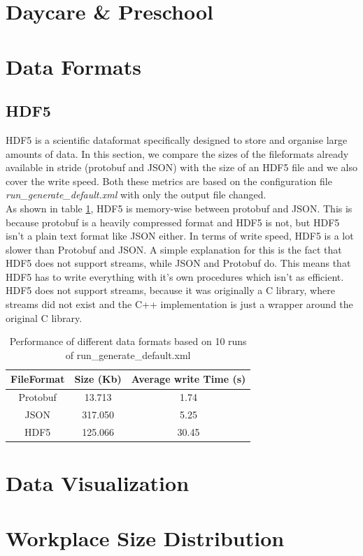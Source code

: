 \documentclass[runningheads]{llncs}
\begin{document}
	\section{Daycare \& Preschool}
	\section{Data Formats}
	\subsection{HDF5}
	HDF5 is a scientific dataformat specifically designed to store and organise large amounts of data. In this section, we compare the sizes of the fileformats already available in stride (protobuf and JSON) with the size of an HDF5 file and we also cover the write speed. Both these metrics are based on the configuration file \textit{run\_generate\_default.xml} with only the output file changed.
	\\
	As shown in table \ref{table:1}, HDF5 is memory-wise between protobuf and JSON. This is because protobuf is a heavily compressed format and HDF5 is not, but HDF5 isn't a plain text format like JSON either. In terms of write speed, HDF5 is a lot slower than Protobuf and JSON. A simple explanation for this is the fact that HDF5 does not support streams, while JSON and Protobuf do. This means that HDF5 has to write everything with it's own procedures which isn't as efficient. HDF5 does not support streams, because it was originally a C library, where streams did not exist and the C++ implementation is just a wrapper around the original C library.
	\begin{table}
		\centering
		\begin{tabular}{|c|c|c|}
			\hline
			\textbf{FileFormat} & \textbf{Size (Kb)}  & \textbf{Average write Time (s)}\\ \hline
			Protobuf & 13.713 & 1.74\\ \hline
			JSON & 317.050 & 5.25\\ \hline
			HDF5 & 125.066 & 30.45 \\ \hline
		\end{tabular}
		\caption{Performance of different data formats based on 10 runs of run\_generate\_default.xml}
		\label{table:1}
	\end{table}
	\section{Data Visualization}
	\section{Workplace Size Distribution}
\end{document}
